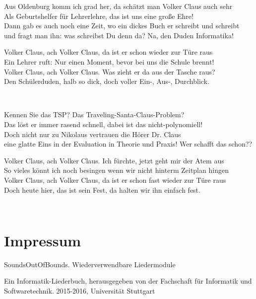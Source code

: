 \documentclass[11pt,a5paper]{article}
\newcommand\refrain[1]{\begin{tcolorbox}#1\end{tcolorbox} \ }
\begin{document}
	Aus Oldenburg komm ich grad her, da schätzt man Volker Claus auch sehr \\
	Als Geburtshelfer für Lehrerlehre, das ist uns eine große Ehre! \\
	Dann gab es auch noch eine Zeit, wo ein dickes Buch er schreibt und schreibt \\
	und fragt man ihn: was schreibst Du denn da? \glqq Na, den Duden Informatika!\grqq \\
	
	\refrain{Volker Claus, ach Volker Claus, da ist er schon wieder zur Türe raus \\
	Ein Lehrer ruft: \glqq Nur einen Moment, bevor bei uns die Schule brennt!\grqq \\
	Volker Claus, ach Volker Claus. Was zieht er da aus der Tasche raus? \\
	Den Schülerduden, halb so dick, doch voller Ein-, Aus-, Durchblick.}
	
	Kennen Sie das TSP? Das Traveling-Santa-Claus-Problem? \\
	Das löst er immer rasend schnell, dabei ist das nicht-polynomiell! \\
	Doch nicht nur zu Nikolaus vertrauen die Hörer Dr. Claus \\
	eine glatte Eins in der Evaluation in Theorie und Praxis! Wer schafft das schon?? \\
	
	\refrain{Volker Claus, ach Volker Claus. Ich fürchte, jetzt geht mir der Atem aus \\
	So vieles könnt ich noch besingen wenn wir nicht hinterm Zeitplan hingen \\
	Volker Claus, ach Volker Claus, da ist er schon fast wieder zur Türe raus \\
	Doch heute hier, das ist sein Fest, da halten wir ihn einfach fest.}
	
	\pagebreak
	
	\vspace*{3.4cm}
	
	\section*{Impressum}
	
	SoundsOutOfBounds. Wiederverwendbare Liedermodule
	
	Ein Informatik-Liederbuch, herausgegeben von der Fachschaft für Informatik und Softwaretechnik. 2015-2016, Universität Stuttgart \\
	
\end{document}
